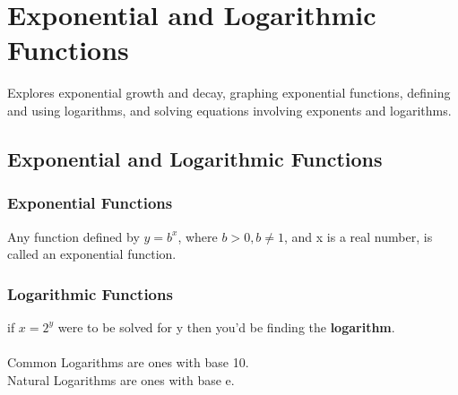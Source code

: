 \chapter{Exponential and Logarithmic Functions}
Explores exponential growth and decay, graphing exponential functions, defining and using logarithms, and solving equations involving exponents and logarithms.

\section{Exponential and Logarithmic Functions}
\subsection{Exponential Functions}
Any function defined by $y = b^x$, where $b > 0, b \ne 1$, and x is a real number, is called an exponential function.\\

\subsection{Logarithmic Functions}
if $x = 2^y$ were to be solved for y then you'd be finding the \textbf{logarithm}.\\
\\
Common Logarithms are ones with base 10.\\
Natural Logarithms are ones with base e.\\

